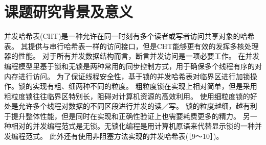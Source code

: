 



\section{课题研究背景及意义}

并发哈希表(CHT)是一种允许在同一时刻有多个读者或写者访问共享对象的哈希表。
其提供与串行哈希表一样的访问接口，但是CHT能够更有效的发挥多核处理器的性能。
对于所有并发数据结构而言，断言并发访问是一项必要工作。
在并发编程模型里基于锁和无锁是两种常用的同步控制方式，用于确保多个线程有序的对内存进行访问。
为了保证线程安全性，基于锁的并发哈希表对临界区进行加锁操作。锁的实现有粗、细两种不同的粒度。
粗粒度锁在实现上相对简单，但是采用粗粒度锁往往临界区特别长，阻碍对计算机资源的高效利用。
使用细粒度锁的好处是允许多个线程对数据的不同区段进行并发的读／写。
锁的粒度越细，越有利于提升整体性能，但是同时在实现和正确性验证上也需要耗费更多的精力。
另一种相对的并发编程范式是无锁。无锁化编程是用计算机原语来代替显示锁的一种并发编程范式。
此外还有使用非阻塞方法实现的并发哈希表\cite{}(［9～10］)。

